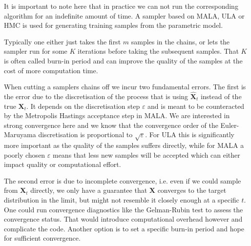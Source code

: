 It is important to note here that in practice we can not run the corresponding algorithm for an indefinite amount of time.
A sampler based on MALA, ULA or HMC is used for generating training samples from the parametric model.

Typically one either just takes the first $m$ samples in the chains, or lets the sampler run for some $K$ iterations before taking the subsequent samples.
That $K$ is often called burn-in period and can improve the quality of the samples at the cost of more computation time.

When cutting a samplers chains off we incur two fundamental errors. 
The first is the error due to the discretisation of the process that is using $\hat{\bm{X}}_t$ instead of the true $\bm{X}_t$.
It depends on the discretisation step $\varepsilon$ and is meant to be counteracted by the Metropolis Hastings acceptance step in MALA.
We are interested in strong convergence here and we know that the convergence order of the Euler-Maruyama discretisation is proportional to $\sqrt{\varepsilon}$.
For ULA this is significantly more important as the quality of the samples suffers directly, 
while for MALA a poorly chosen $\varepsilon$ means that less new samples will be accepted which can either impact quality or computational effort.

The second error is due to incomplete convergence, i.e. even if we could sample from $\bm{X}_t$ directly,
we only have a guarantee that $\bm{X}$ converges to the target distribution in the limit, 
but might not resemble it closely enough at a specific $t$.
One could run convergence diagnostics like the Gelman-Rubin test to assess the convergence status.
That would introduce computational overhead however and complicate the code.
Another option is to set a specific burn-in period and hope for sufficient convergence.







